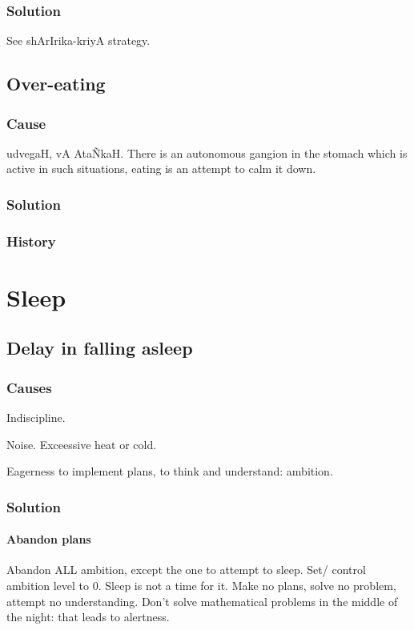 \documentclass[oneside, article]{memoir}
\begin{document}
\subsection{Solution}
See shArIrika-kriyA strategy.


\section{Over-eating}
\subsection{Cause}
udvegaH, vA Ata\~NkaH. There is an autonomous gangion in the stomach which is active in such situations, eating is an attempt to calm it down.

\subsection{Solution}

\subsection{History}


\chapter{Sleep}
\section{Delay in falling asleep}
\subsection{Causes}
Indiscipline.

Noise. Exceessive heat or cold.

Eagerness to implement plans, to think and understand: ambition.

\subsection{Solution}
\subsubsection{Abandon plans}
Abandon ALL ambition, except the one to attempt to sleep. Set/ control ambition level to 0. Sleep is not a time for it. Make no plans, solve no problem, attempt no understanding. Don't solve mathematical problems in the middle of the night: that leads to alertness.
\end{document}
